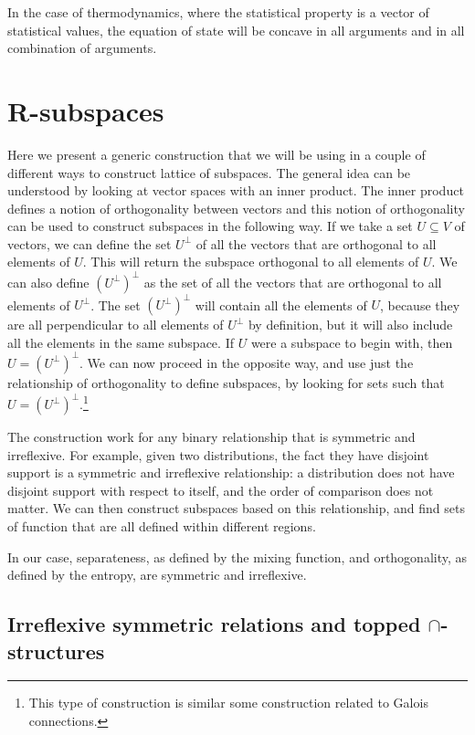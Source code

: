 \begin{remark}
	In the case of thermodynamics, where the statistical property is a vector of statistical values, the equation of state will be concave in all arguments and in all combination of arguments.
\end{remark}


\section{R-subspaces}\label{pm_es_subspaceSection}

Here we present a generic construction that we will be using in a couple of different ways to construct lattice of subspaces. The general idea can be understood by looking at vector spaces with an inner product. The inner product defines a notion of orthogonality between vectors and this notion of orthogonality can be used to construct subspaces in the following way. If we take a set $U \subseteq V$ of vectors, we can define the set $U^{\perp}$ of all the vectors that are orthogonal to all elements of $U$. This will return the subspace orthogonal to all elements of $U$. We can also define $(U^{\perp})^{\perp}$ as the set of all the vectors that are orthogonal to all elements of $U^{\perp}$. The set $(U^{\perp})^{\perp}$ will contain all the elements of $U$, because they are all perpendicular to all elements of $U^{\perp}$ by definition, but it will also include all the elements in the same subspace. If $U$ were a subspace to begin with, then $U = (U^{\perp})^{\perp}$. We can now proceed in the opposite way, and use just the relationship of orthogonality to define subspaces, by looking for sets such that $U = (U^{\perp})^{\perp}$.\footnote{This type of construction is similar some construction related to Galois connections.}

The construction work for any binary relationship that is symmetric and irreflexive. For example, given two distributions, the fact they have disjoint support is a symmetric and irreflexive relationship: a distribution does not have disjoint support with respect to itself, and the order of comparison does not matter. We can then construct subspaces based on this relationship, and find sets of function that are all defined within different regions.

In our case, separateness, as defined by the mixing function, and orthogonality, as defined by the entropy, are symmetric and irreflexive.

\subsection{Irreflexive symmetric relations and topped $\cap$-structures}

